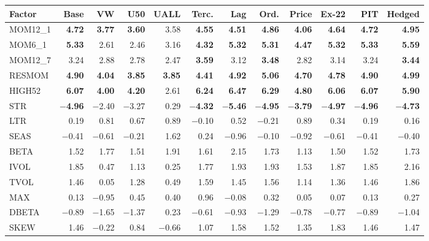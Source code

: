 \begin{tabular}{lrrrrrrrrrrr}
\toprule
Factor & Base & VW & U50 & UALL & Terc. & Lag & Ord. & Price & Ex-22 & PIT & Hedged \\
\midrule
MOM12\_1 & \textbf{4.72} & \textbf{3.77} & \textbf{3.60} & 3.58 & \textbf{4.55} & \textbf{4.51} & \textbf{4.86} & \textbf{4.06} & \textbf{4.64} & \textbf{4.72} & \textbf{4.95} \\
MOM6\_1 & \textbf{5.33} & 2.61 & 2.46 & 3.16 & \textbf{4.32} & \textbf{5.32} & \textbf{5.31} & \textbf{4.47} & \textbf{5.32} & \textbf{5.33} & \textbf{5.59} \\
MOM12\_7 & 3.24 & 2.88 & 2.78 & 2.47 & \textbf{3.59} & 3.12 & \textbf{3.48} & 2.82 & 3.14 & 3.24 & \textbf{3.44} \\
RESMOM & \textbf{4.90} & \textbf{4.04} & \textbf{3.85} & \textbf{3.85} & \textbf{4.41} & \textbf{4.92} & \textbf{5.06} & \textbf{4.70} & \textbf{4.78} & \textbf{4.90} & \textbf{4.99} \\
HIGH52 & \textbf{6.07} & \textbf{4.00} & \textbf{4.20} & 2.61 & \textbf{6.24} & \textbf{6.47} & \textbf{6.29} & \textbf{4.80} & \textbf{6.06} & \textbf{6.07} & \textbf{5.90} \\
\addlinespace[2pt]
STR & \textbf{$-$4.96} & $-$2.40 & $-$3.27 & 0.29 & \textbf{$-$4.32} & \textbf{$-$5.46} & \textbf{$-$4.95} & \textbf{$-$3.79} & \textbf{$-$4.97} & \textbf{$-$4.96} & \textbf{$-$4.73} \\
LTR & 0.19 & 0.81 & 0.67 & 0.89 & $-$0.10 & 0.52 & $-$0.21 & 0.89 & 0.34 & 0.19 & 0.16 \\
\addlinespace[2pt]
SEAS & $-$0.41 & $-$0.61 & $-$0.21 & 1.62 & 0.24 & $-$0.96 & $-$0.10 & $-$0.92 & $-$0.61 & $-$0.41 & $-$0.40 \\
\addlinespace[2pt]
BETA & 1.52 & 1.77 & 1.51 & 1.91 & 1.61 & 2.15 & 1.73 & 1.13 & 1.50 & 1.52 & 1.73 \\
IVOL & 1.85 & 0.47 & 1.13 & 0.25 & 1.77 & 1.93 & 1.93 & 1.53 & 1.87 & 1.85 & 2.16 \\
TVOL & 1.46 & 0.05 & 1.28 & 0.49 & 1.59 & 1.45 & 1.56 & 1.14 & 1.36 & 1.46 & 1.86 \\
MAX & 0.13 & $-$0.95 & 0.45 & 0.40 & 0.96 & $-$0.08 & 0.32 & 0.05 & 0.07 & 0.13 & 0.27 \\
\addlinespace[2pt]
DBETA & $-$0.89 & $-$1.65 & $-$1.37 & 0.23 & $-$0.61 & $-$0.93 & $-$1.29 & $-$0.78 & $-$0.77 & $-$0.89 & $-$1.04 \\
SKEW & 1.46 & $-$0.22 & 0.84 & $-$0.66 & 1.07 & 1.58 & 1.52 & 1.35 & 1.83 & 1.46 & 1.47 \\

\end{tabular}
